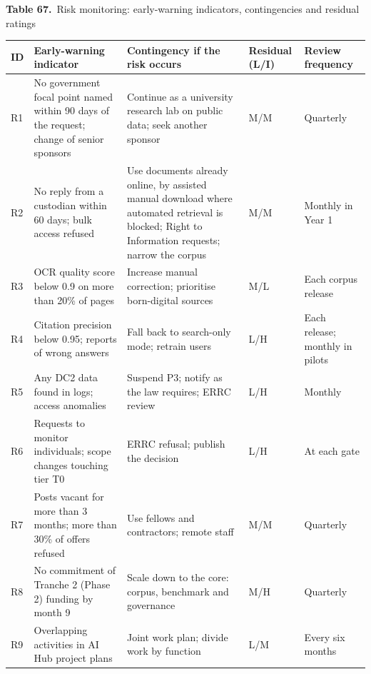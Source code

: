 \documentclass[border=10pt]{standalone}
\begin{document}
\begin{minipage}{17cm}
{\large\bfseries Table 67.}\ {\large Risk monitoring: early-warning indicators, contingencies and residual ratings}\par\vspace{7pt}
\small
{}
\begin{tabularx}{\linewidth}{@{}>{\hsize=0.326\hsize\raggedright\arraybackslash}X>{\hsize=1.630\hsize\raggedright\arraybackslash}X>{\hsize=1.522\hsize\raggedright\arraybackslash}X>{\hsize=0.652\hsize\raggedright\arraybackslash}X>{\hsize=0.870\hsize\raggedright\arraybackslash}X@{}}
\arrayrulecolor{bapilrule}\toprule
\rowcolor{white}\textbf{ID} & \textbf{Early-warning indicator} & \textbf{Contingency if the risk occurs} & \textbf{Residual (L/\allowbreak{}I)} & \textbf{Review frequency} \\
\midrule
R1 & No government focal point named within 90 days of the request; change of senior sponsors & Continue as a university research lab on public data; seek another sponsor & M/\allowbreak{}M & Quarterly \\
R2 & No reply from a custodian within 60 days; bulk access refused & Use documents already online, by assisted manual download where automated retrieval is blocked; Right to Information requests; narrow the corpus & M/\allowbreak{}M & Monthly in Year 1 \\
R3 & OCR quality score below 0.9 on more than 20\% of pages & Increase manual correction; prioritise born-digital sources & M/\allowbreak{}L & Each corpus release \\
R4 & Citation precision below 0.95; reports of wrong answers & Fall back to search-only mode; retrain users & L/\allowbreak{}H & Each release; monthly in pilots \\
R5 & Any DC2 data found in logs; access anomalies & Suspend P3; notify as the law requires; ERRC review & L/\allowbreak{}H & Monthly \\
R6 & Requests to monitor individuals; scope changes touching tier T0 & ERRC refusal; publish the decision & L/\allowbreak{}H & At each gate \\
R7 & Posts vacant for more than 3 months; more than 30\% of offers refused & Use fellows and contractors; remote staff & M/\allowbreak{}M & Quarterly \\
R8 & No commitment of Tranche 2 (Phase 2) funding by month 9 & Scale down to the core: corpus, benchmark and governance & M/\allowbreak{}H & Quarterly \\
R9 & Overlapping activities in AI Hub project plans & Joint work plan; divide work by function & L/\allowbreak{}M & Every six months \\

\end{tabularx}
\end{minipage}
\end{document}
